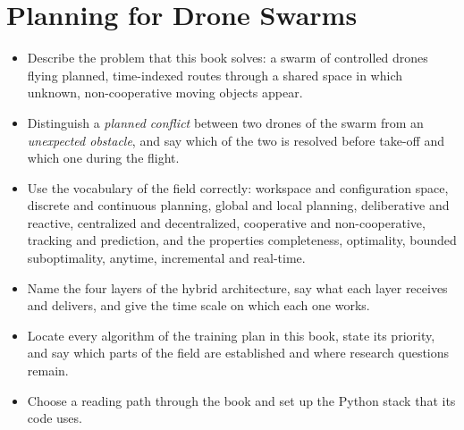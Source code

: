 \chapter{Planning for Drone Swarms}
\label{ch:ch01}

\begin{objectives}
\begin{itemize}
  \item Describe the problem that this book solves: a swarm of controlled drones
        flying planned, time-indexed routes through a shared space in which unknown,
        non-cooperative moving objects appear.
  \item Distinguish a \emph{planned conflict} between two drones of the swarm from an
        \emph{unexpected obstacle}, and say which of the two is resolved before
        take-off and which one during the flight.
  \item Use the vocabulary of the field correctly: workspace and configuration space,
        discrete and continuous planning, global and local planning, deliberative and
        reactive, centralized and decentralized, cooperative and non-cooperative,
        tracking and prediction, and the properties completeness, optimality, bounded
        suboptimality, anytime, incremental and real-time.
  \item Name the four layers of the hybrid architecture, say what each layer receives
        and delivers, and give the time scale on which each one works.
  \item Locate every algorithm of the training plan in this book, state its priority,
        and say which parts of the field are established and where research questions
        remain.
  \item Choose a reading path through the book and set up the Python stack that its
        code uses.
\end{itemize}
\end{objectives}

